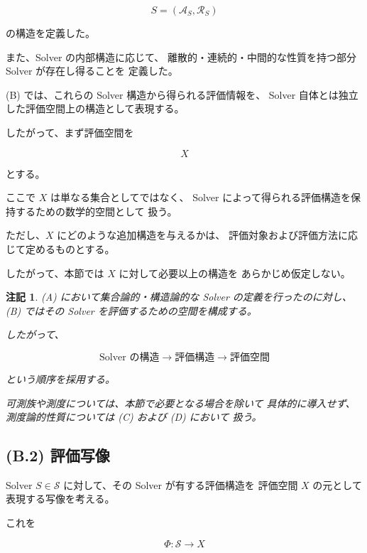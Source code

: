 \documentclass[a4paper,11pt]{article}
\newtheorem{remark}[definition]{注記}
\newcommand{\Solver}{\mathcal{S}}
\newcommand{\Aset}{\mathcal{A}}
\newcommand{\Rset}{\mathcal{R}}
\begin{document}
\begin{equation}
    S
    =
    \left(
        \Aset_S,
        \Rset_S
    \right)
\end{equation}

の構造を定義した。

また、Solver の内部構造に応じて、
離散的・連続的・中間的な性質を持つ部分 Solver が存在し得ることを
定義した。

(B) では、これらの Solver 構造から得られる評価情報を、
Solver 自体とは独立した評価空間上の構造として表現する。

したがって、まず評価空間を

\begin{equation}
    X
\end{equation}

とする。

ここで $X$ は単なる集合としてではなく、
Solver によって得られる評価構造を保持するための数学的空間として
扱う。

ただし、$X$ にどのような追加構造を与えるかは、
評価対象および評価方法に応じて定めるものとする。

したがって、本節では $X$ に対して必要以上の構造を
あらかじめ仮定しない。

\begin{remark}
(A) において集合論的・構造論的な Solver の定義を行ったのに対し、
(B) ではその Solver を評価するための空間を構成する。

したがって、

\begin{equation}
    \text{Solver の構造}
    \longrightarrow
    \text{評価構造}
    \longrightarrow
    \text{評価空間}
\end{equation}

という順序を採用する。

可測族や測度については、本節で必要となる場合を除いて
具体的に導入せず、測度論的性質については (C) および (D) において
扱う。
\end{remark}


\subsection{(B.2) 評価写像}
\label{subsec:B2}

Solver $S\in\Solver$ に対して、その Solver が有する評価構造を
評価空間 $X$ の元として表現する写像を考える。

これを

\begin{equation}
    \boxed{
        \Phi:
        \Solver
        \longrightarrow
        X
    }
    \label{eq:B-evaluation-map}
\end{equation}
\end{document}
